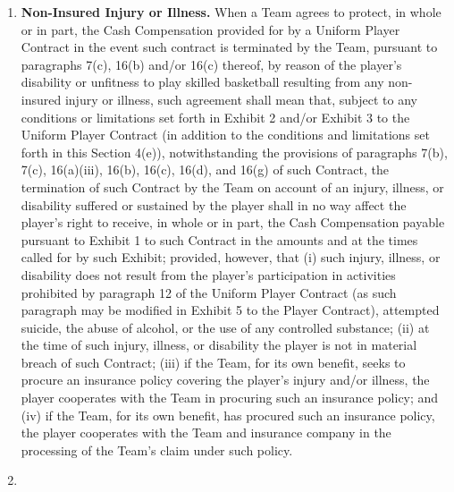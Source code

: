 \documentclass[
]{book}
\begin{document}
\begin{enumerate}
\item
  \textbf{Non-Insured Injury or Illness.} When a Team agrees to protect, in whole or in part, the Cash Compensation provided for by a Uniform Player Contract in the event such contract is terminated by the Team, pursuant to paragraphs 7(c), 16(b) and/or 16(c) thereof, by reason of the player's disability or unfitness to play skilled basketball resulting from any non-insured injury or illness, such agreement shall mean that, subject to any conditions or limitations set forth in Exhibit 2 and/or Exhibit 3 to the Uniform Player Contract (in addition to the conditions and limitations set forth in this Section 4(e)), notwithstanding the provisions of paragraphs 7(b), 7(c), 16(a)(iii), 16(b), 16(c), 16(d), and 16(g) of such Contract, the termination of such Contract by the Team on account of an injury, illness, or disability suffered or sustained by the player shall in no way affect the player's right to receive, in whole or in part, the Cash Compensation payable pursuant to Exhibit 1 to such Contract in the amounts and at the times called for by such Exhibit; provided, however, that (i) such injury, illness, or disability does not result from the player's participation in activities prohibited by paragraph 12 of the Uniform Player Contract (as such paragraph may be modified in Exhibit 5 to the Player Contract), attempted suicide, the abuse of alcohol, or the use of any controlled substance; (ii) at the time of such injury, illness, or disability the player is not in material breach of such Contract; (iii) if the Team, for its own benefit, seeks to procure an insurance policy covering the player's injury and/or illness, the player cooperates with the Team in procuring such an insurance policy; and (iv) if the Team, for its own benefit, has procured such an insurance policy, the player cooperates with the Team and insurance company in the processing of the Team's claim under such policy.
\item

\end{enumerate}
\end{document}
